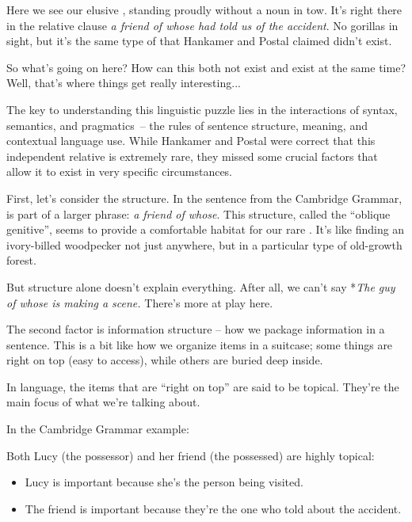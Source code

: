 Here we see our elusive , standing proudly without a noun in tow. It's right there in the relative clause \textit{a friend of whose had told us of the accident}. No gorillas in sight, but it's the same type of  that Hankamer and Postal claimed didn't exist.

\bigskip

So what's going on here? How can this  both not exist and exist at the same time? Well, that's where things get really interesting...

The key to understanding this linguistic puzzle lies in the interactions of syntax, semantics, and pragmatics~-- the rules of sentence structure, meaning, and contextual language use. While Hankamer and Postal were correct that this independent relative  is extremely rare, they missed some crucial factors that allow it to exist in very specific circumstances.

First, let's consider the structure. In the sentence from the Cambridge Grammar,  is part of a larger phrase: \textit{a friend of whose}. This structure, called the \enquote{oblique genitive}, seems to provide a comfortable habitat for our rare . It's like finding an ivory-billed woodpecker not just anywhere, but in a particular type of old-growth forest.

But structure alone doesn't explain everything. After all, we can't say *\textit{The guy of whose is making a scene.} There's more at play here.

The second factor is information structure -- how we package information in a sentence. This is a bit like how we organize items in a suitcase; some things are right on top (easy to access), while others are buried deep inside.

In language, the items that are \enquote{right on top} are said to be topical. They're the main focus of what we're talking about.

In the Cambridge Grammar example:

\z

Both Lucy (the possessor) and her friend (the possessed) are highly topical:

\begin{itemize}
    \item Lucy is important because she's the person being visited.
    \item The friend is important because they're the one who told about the accident.
\end{itemize}

